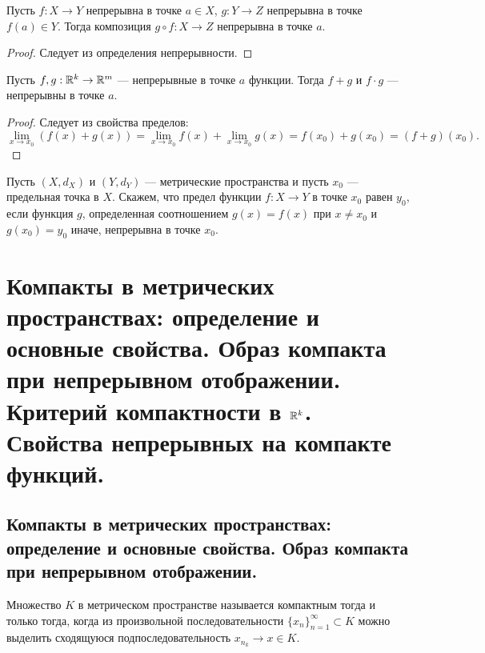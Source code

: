 \documentclass[a4paper]{article}
\theoremstyle{named}
\begin{document}
    \begin{proposal*}
        Пусть $f: X \to Y$ непрерывна в точке $a \in X$, $g: Y \to Z$ непрерывна в точке $f(a) \in Y$. Тогда композиция $g \circ f: X \to Z$ непрерывна в точке $a$.
    \end{proposal*}

    \begin{proof}
        Следует из определения непрерывности.
    \end{proof}

    \begin{consequence*}
        Пусть $f, g: \mathbb{R}^k \to \mathbb{R}^m$ --- непрерывные в точке $a$ функции. Тогда $f + g$ и $f \cdot g$ --- непрерывны в точке $a$.
    \end{consequence*}

    \begin{proof}
        Следует из свойства пределов:
        \begin{equation*}
            \lim_{x \to x_0} (f(x) + g(x)) = \lim_{x \to x_0} f(x) + \lim_{x \to x_0} g(x) = f(x_0) + g(x_0) = (f + g)(x_0).
        \end{equation*}
    \end{proof}

    \begin{definition*}
        Пусть $(X, d_X)$ и $(Y, d_Y)$ --- метрические пространства и пусть $x_0$ --- предельная точка в $X$. Скажем, что предел функции $f: X \to Y$ в точке $x_0$ равен $y_0$, если функция $g$, определенная соотношением $g(x) = f(x)$ при $x \neq x_0$ и $g(x_0) = y_0$ иначе, непрерывна в точке $x_0$.
    \end{definition*}
        
    \section{Компакты в метрических пространствах: определение и основные свойства. Образ компакта при непрерывном отображении. Критерий компактности в $\mathbb{R}^k$. Свойства непрерывных на компакте функций.}

    \subsection{Компакты в метрических пространствах: определение и основные свойства. Образ компакта при непрерывном отображении.}

    \begin{definition*}
        Множество $K$ в метрическом пространстве называется компактным тогда и только тогда, когда из произвольной последовательности $\{x_n\}_{n = 1}^{\infty} \subset K$ можно выделить сходящуюся подпоследовательность $x_{n_k} \to x \in K$.
    \end{definition*}
\end{document}
